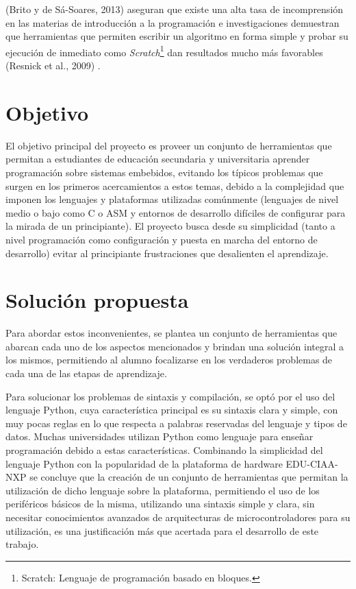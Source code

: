 (Brito y de Sá-Soares, 2013) \cite{papereducacion3} aseguran que existe una alta tasa de incomprensión en las materias de introducción a la programación
e investigaciones demuestran que herramientas que permiten escribir un algoritmo en forma simple y probar su ejecución de inmediato como \textit{Scratch}\footnote{Scratch: Lenguaje de programación basado en bloques.} dan resultados mucho más favorables (Resnick et al., 2009) \cite{papereducacion4}.


\section{Objetivo}

El objetivo principal del proyecto es proveer un conjunto de herramientas que permitan a estudiantes de educación secundaria y universitaria aprender programación sobre sistemas embebidos, evitando los típicos problemas que surgen en los primeros acercamientos a estos temas, debido a la complejidad que imponen los lenguajes y plataformas utilizadas comúnmente (lenguajes de nivel medio o bajo como C o ASM y entornos de desarrollo difíciles de configurar para la mirada de un principiante).
El proyecto busca desde su simplicidad (tanto a nivel programación como configuración y puesta en marcha del entorno de desarrollo) evitar al principiante frustraciones que desalienten el aprendizaje.

\section{Solución propuesta}

Para abordar estos inconvenientes, se plantea un conjunto de herramientas que abarcan cada uno de los aspectos mencionados y brindan una solución integral a los mismos, permitiendo al alumno focalizarse en los verdaderos problemas de cada una de las etapas de aprendizaje.
 
Para solucionar los problemas de sintaxis y compilación, se optó por el uso del lenguaje Python, cuya característica principal es su sintaxis clara y simple, con muy pocas reglas en lo que respecta a palabras reservadas del lenguaje y tipos de datos. Muchas universidades utilizan Python como lenguaje para enseñar programación debido a estas características\cite{papereducacion}. Combinando la simplicidad del lenguaje Python con la popularidad de la plataforma de hardware EDU-CIAA-NXP se concluye que la creación de un conjunto de herramientas que permitan la utilización de dicho lenguaje sobre la plataforma, permitiendo el uso de los periféricos básicos de la misma, utilizando una sintaxis simple y clara, sin necesitar conocimientos avanzados de arquitecturas de microcontroladores para su utilización, es una justificación más que acertada para el desarrollo de este trabajo.

